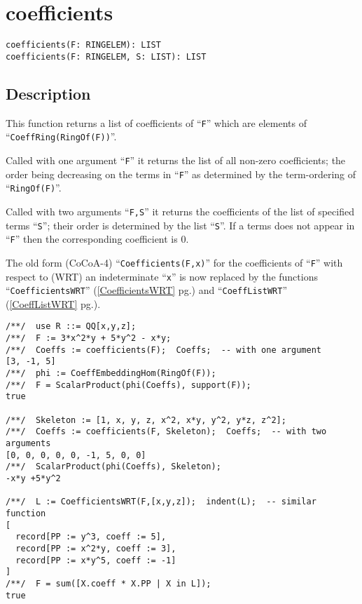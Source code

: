 \documentclass[a4paper]{mybook}
\newenvironment{command}{}{} %
\begin{document}
\section{coefficients}
\label{coefficients}
\begin{command} %


\begin{Verbatim}[label=syntax, rulecolor=\color{MidnightBlue},
frame=single]
coefficients(F: RINGELEM): LIST
coefficients(F: RINGELEM, S: LIST): LIST
\end{Verbatim}


\subsection*{Description}

This function returns a list of coefficients of ``\verb&F&'' which are
elements of ``\verb&CoeffRing(RingOf(F))&''.
\par 
Called with one argument ``\verb&F&'' it returns the list of all non-zero
coefficients; the order being decreasing on the terms in ``\verb&F&'' as
determined by the term-ordering of ``\verb&RingOf(F)&''.
\par 
Called with two arguments ``\verb&F,S&'' it returns the coefficients of the
list of specified terms ``\verb&S&''; their order is determined by the list
``\verb&S&''.  If a terms does not appear in ``\verb&F&'' then the corresponding
coefficient is 0.
\par 
The old form (CoCoA-4) ``\verb&Coefficients(F,x)&'' for the coefficients of
``\verb&F&'' with respect to (WRT) an indeterminate ``\verb&x&'' is now
replaced by the functions ``\verb&CoefficientsWRT&'' (\ref{CoefficientsWRT} pg.\pageref{CoefficientsWRT}) and ``\verb&CoeffListWRT&'' (\ref{CoeffListWRT} pg.\pageref{CoeffListWRT}).
\begin{Verbatim}[label=example, rulecolor=\color{PineGreen}, frame=single]
/**/  use R ::= QQ[x,y,z];
/**/  F := 3*x^2*y + 5*y^2 - x*y;
/**/  Coeffs := coefficients(F);  Coeffs;  -- with one argument
[3, -1, 5]
/**/  phi := CoeffEmbeddingHom(RingOf(F));
/**/  F = ScalarProduct(phi(Coeffs), support(F));
true

/**/  Skeleton := [1, x, y, z, x^2, x*y, y^2, y*z, z^2];
/**/  Coeffs := coefficients(F, Skeleton);  Coeffs;  -- with two arguments
[0, 0, 0, 0, 0, -1, 5, 0, 0]
/**/  ScalarProduct(phi(Coeffs), Skeleton);
-x*y +5*y^2

/**/  L := CoefficientsWRT(F,[x,y,z]);  indent(L);  -- similar function
[
  record[PP := y^3, coeff := 5],
  record[PP := x^2*y, coeff := 3],
  record[PP := x*y^5, coeff := -1]
]
/**/  F = sum([X.coeff * X.PP | X in L]);
true


\end{Verbatim}
\end{command}
\end{document}
